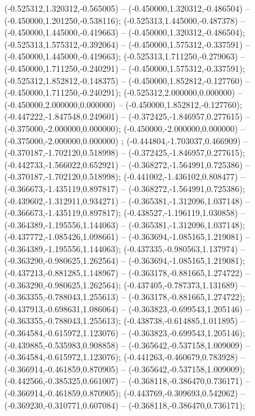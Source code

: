  (-0.525312,1.320312,-0.565005) -- (-0.450000,1.320312,-0.486504) -- (-0.450000,1.201250,-0.538116);
 (-0.525313,1.445000,-0.487378) -- (-0.450000,1.445000,-0.419663) -- (-0.450000,1.320312,-0.486504);
 (-0.525313,1.575312,-0.392064) -- (-0.450000,1.575312,-0.337591) -- (-0.450000,1.445000,-0.419663);
 (-0.525313,1.711250,-0.279063) -- (-0.450000,1.711250,-0.240291) -- (-0.450000,1.575312,-0.337591);
 (-0.525312,1.852812,-0.148375) -- (-0.450000,1.852812,-0.127760) -- (-0.450000,1.711250,-0.240291);
 (-0.525312,2.000000,0.000000) -- (-0.450000,2.000000,0.000000) -- (-0.450000,1.852812,-0.127760);
 (-0.447222,-1.847548,0.249601) -- (-0.372425,-1.846957,0.277615) -- (-0.375000,-2.000000,0.000000);
 (-0.450000,-2.000000,0.000000) -- (-0.375000,-2.000000,0.000000) ;
 (-0.444804,-1.703037,0.466909) -- (-0.370187,-1.702120,0.518998) -- (-0.372425,-1.846957,0.277615);
 (-0.442733,-1.566022,0.652921) -- (-0.368272,-1.564991,0.725386) -- (-0.370187,-1.702120,0.518998);
 (-0.441002,-1.436102,0.808477) -- (-0.366673,-1.435119,0.897817) -- (-0.368272,-1.564991,0.725386);
 (-0.439602,-1.312911,0.934271) -- (-0.365381,-1.312096,1.037148) -- (-0.366673,-1.435119,0.897817);
 (-0.438527,-1.196119,1.030858) -- (-0.364389,-1.195556,1.144063) -- (-0.365381,-1.312096,1.037148);
 (-0.437772,-1.085426,1.098661) -- (-0.363694,-1.085165,1.219081) -- (-0.364389,-1.195556,1.144063);
 (-0.437335,-0.980563,1.137974) -- (-0.363290,-0.980625,1.262564) -- (-0.363694,-1.085165,1.219081);
 (-0.437213,-0.881285,1.148967) -- (-0.363178,-0.881665,1.274722) -- (-0.363290,-0.980625,1.262564);
 (-0.437405,-0.787373,1.131689) -- (-0.363355,-0.788043,1.255613) -- (-0.363178,-0.881665,1.274722);
 (-0.437913,-0.698631,1.086064) -- (-0.363823,-0.699543,1.205146) -- (-0.363355,-0.788043,1.255613);
 (-0.438738,-0.614885,1.011895) -- (-0.364584,-0.615972,1.123076) -- (-0.363823,-0.699543,1.205146);
 (-0.439885,-0.535983,0.908858) -- (-0.365642,-0.537158,1.009009) -- (-0.364584,-0.615972,1.123076);
 (-0.441263,-0.460679,0.783928) -- (-0.366914,-0.461859,0.870905) -- (-0.365642,-0.537158,1.009009);
 (-0.442566,-0.385325,0.661007) -- (-0.368118,-0.386470,0.736171) -- (-0.366914,-0.461859,0.870905);
 (-0.443769,-0.309693,0.542062) -- (-0.369230,-0.310771,0.607084) -- (-0.368118,-0.386470,0.736171);
